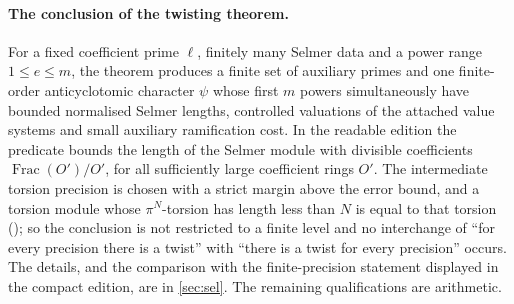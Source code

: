 \paragraph{The conclusion of the twisting theorem.}
For a fixed coefficient prime $\ell$, finitely many Selmer data and a power range
$1\le e\le m$, the theorem  produces a finite set of
auxiliary primes and one finite-order anticyclotomic character $\psi$ whose first $m$ powers
simultaneously have bounded normalised Selmer lengths, controlled valuations of the attached
value systems and small auxiliary ramification cost. In the readable edition the predicate
 bounds the length of the Selmer module with divisible coefficients
$\operatorname{Frac}(O')/O'$, for all sufficiently large coefficient rings $O'$. The
intermediate torsion precision is chosen with a strict margin above the error bound, and a
torsion module whose $\pi^N$-torsion has length less than $N$ is equal to that torsion
(); so the conclusion is not restricted to a finite
level and no interchange of ``for every precision there is a twist'' with ``there is a twist
for every precision'' occurs. The details, and the comparison with the finite-precision
statement displayed in the compact edition, are in \cref{sec:sel}. The remaining
qualifications are arithmetic.
